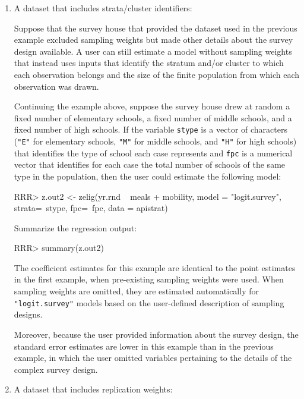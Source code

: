 \begin{enumerate}
\item  A dataset that includes strata/cluster identifiers:

Suppose that the survey house that provided the dataset used in the
previous example excluded sampling weights but made other details
about the survey design available.  A user can still estimate a model
without sampling weights that instead uses inputs that identify the
stratum and/or cluster to which each observation belongs and the
size of the finite population from which each observation was drawn.

Continuing the example above, suppose the survey house drew at
random a fixed number of elementary schools, a fixed number of
middle schools, and a fixed number of high schools. If the variable
{\tt stype} is a vector of characters ({\tt "E"} for elementary
schools, {\tt "M"} for middle schools, and {\tt "H"} for high schools)
that identifies the type of school each case
represents and {\tt fpc} is a numerical vector that identifies for
each case the total number of schools of the same type in the
population, then the user could estimate the following model:

\begin{Schunk}
\begin{Sinput}
RRR> z.out2 <- zelig(yr.rnd ~ meals + mobility, model = "logit.survey", strata=~stype, fpc=~fpc, data = apistrat)
\end{Sinput}
\end{Schunk}
Summarize the regression output:
\begin{Schunk}
\begin{Sinput}
RRR> summary(z.out2) 
\end{Sinput}
\end{Schunk}
The coefficient estimates for this example are
identical to the point estimates in the first example, when
pre-existing sampling weights were used.  When sampling weights are
omitted, they are estimated automatically for {\tt "logit.survey"}
models based on the user-defined description of sampling designs. 

Moreover, because the user provided information about the survey
design, the standard error estimates are lower in this example than
in the previous example, in which the user omitted variables pertaining
to the details of the complex survey design.

\item A dataset that includes replication weights:


\end{enumerate}
